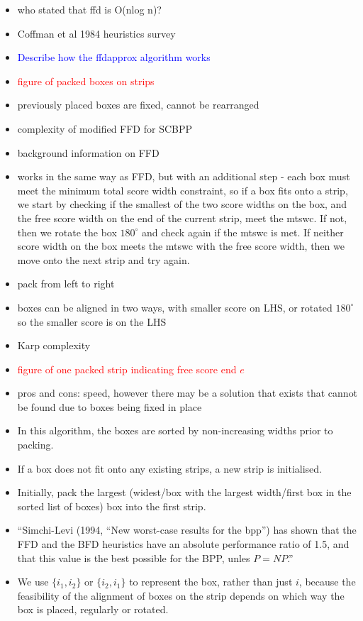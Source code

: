 \documentclass[oribibl]{llncs}
\begin{document}
\begin{itemize}
	\item who stated that ffd is O(nlog n)?
	\item Coffman et al 1984 heuristics survey
	\item \textcolor{blue}{Describe how the ffdapprox algorithm works}
	\item \textcolor{red}{figure of packed boxes on strips}
	\item previously placed boxes are fixed, cannot be rearranged
	\item complexity of modified FFD for SCBPP
	\item background information on FFD
	\item works in the same way as FFD, but with an additional step - each box must meet the minimum total score width constraint, so if a box fits onto a strip, we start by checking if the smallest of the two score widths on the box, and the free score width on the end of the current strip, meet the mtswc. If not, then we rotate the box $180^{\circ}$ and check again if the mtswc is met. If neither score width on the box meets the mtswc with the free score width, then we move onto the next strip and try again.
	\item pack from left to right
	\item boxes can be aligned in two ways, with smaller score on LHS, or rotated $180^{\circ}$ so the smaller score is on the LHS
	\item Karp complexity
	\item \textcolor{red}{figure of one packed strip indicating free score end $e$}
	\item pros and cons: speed, however there may be a solution that exists that cannot be found due to boxes being fixed in place
	\item In this algorithm, the boxes are sorted by non-increasing widths prior to packing.
	\item If a box does not fit onto any existing strips, a new strip is initialised.
	\item Initially, pack the largest (widest/box with the largest width/first box in the sorted list of boxes) box into the first strip.
	\item ``Simchi-Levi (1994, ``New worst-case results for the bpp'') has shown that the FFD and the BFD heuristics have an absolute performance ratio of 1.5, and that this value is the best possible for the BPP, unles $P = NP$.''
	\item We use $\{i_1, i_2\}$ or $\{i_2, i_1\}$ to represent the box, rather than just $i$, because the feasibility of the alignment of boxes on the strip depends on which way the box is placed, regularly or rotated.
\end{itemize}
\end{document}
